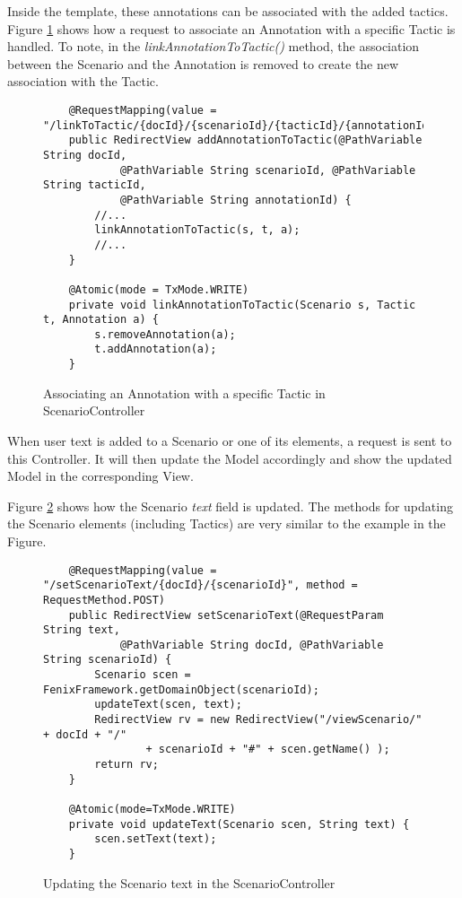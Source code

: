 Inside the template, these annotations can be associated with the added tactics. Figure \ref{figure:scenarioControllerLinkToTactic} shows how a request to associate an Annotation with a specific Tactic is handled. To note, in the \textit{linkAnnotationToTactic()} method, the association between the Scenario and the Annotation is removed to create the new association with the Tactic.

\begin{figure}[h]
\lstset{style=customjava}
\begin{lstlisting}
	@RequestMapping(value = "/linkToTactic/{docId}/{scenarioId}/{tacticId}/{annotationId}")
	public RedirectView addAnnotationToTactic(@PathVariable String docId,
			@PathVariable String scenarioId, @PathVariable String tacticId,
			@PathVariable String annotationId) {
		//...
		linkAnnotationToTactic(s, t, a);
		//...
	}
	
	@Atomic(mode = TxMode.WRITE)
	private void linkAnnotationToTactic(Scenario s, Tactic t, Annotation a) {
		s.removeAnnotation(a);
		t.addAnnotation(a);
	}
\end{lstlisting}
\caption{Associating an Annotation with a specific Tactic in ScenarioController}
\label{figure:scenarioControllerLinkToTactic}
\end{figure}

When user text is added to a Scenario or one of its elements, a request is sent to this Controller. It will then update the Model accordingly and show the updated Model in the corresponding View.

Figure \ref{figure:scenarioControllerText} shows how the Scenario \textit{text} field is updated. The methods for updating the Scenario elements (including Tactics) are very similar to the example in the Figure.

\begin{figure}[h]
\lstset{style=customjava}
\begin{lstlisting}
	@RequestMapping(value = "/setScenarioText/{docId}/{scenarioId}", method = RequestMethod.POST)
	public RedirectView setScenarioText(@RequestParam String text,
			@PathVariable String docId, @PathVariable String scenarioId) {
		Scenario scen = FenixFramework.getDomainObject(scenarioId);
		updateText(scen, text);
		RedirectView rv = new RedirectView("/viewScenario/" + docId + "/"
				+ scenarioId + "#" + scen.getName() );
		return rv;
	}
	
	@Atomic(mode=TxMode.WRITE)
	private void updateText(Scenario scen, String text) {
		scen.setText(text);
	}	
\end{lstlisting}
\caption{Updating the Scenario text in the ScenarioController}
\label{figure:scenarioControllerText}
\end{figure}

